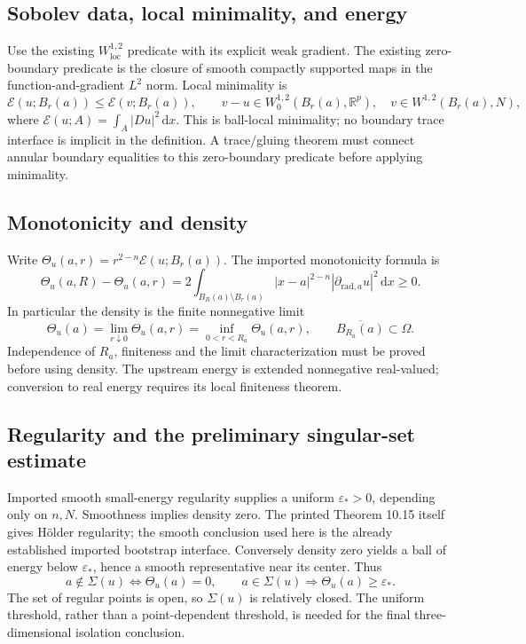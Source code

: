 \documentclass[11pt,a4paper]{article}
\numberwithin{equation}{section}
\theoremstyle{definition}
\theoremstyle{remark}
\newcommand{\R}{\mathbb R}
\newcommand{\dd}{\,\mathrm d}
\newcommand{\E}{\mathcal E}
\newcommand{\Th}{\Theta}
\newcommand{\loc}{\mathrm{loc}}
\begin{document}
\subsection{Sobolev data, local minimality, and energy}\label{def:foundation}
Use the existing $W^{1,2}_{\loc}$ predicate with its explicit weak gradient.
The existing zero-boundary predicate is the closure of smooth compactly
supported maps in the function-and-gradient $L^2$ norm. Local minimality is
\begin{equation}\label{eq:minimality}
 \E(u;B_r(a))\le\E(v;B_r(a)),\qquad
 v-u\in W^{1,2}_0(B_r(a),\R^p),\quad v\in W^{1,2}(B_r(a),N),
\end{equation}
where $\E(u;A)=\int_A|Du|^2\dd x$. This is ball-local minimality;
no boundary trace interface is implicit in the definition. A trace/gluing
theorem must connect annular boundary equalities to this zero-boundary
predicate before applying minimality.

\subsection{Monotonicity and density}\label{def:density}
Write $\Th_u(a,r)=r^{2-n}\E(u;B_r(a))$. The imported monotonicity formula is
\begin{equation}\label{eq:monotonicity}
 \Th_u(a,R)-\Th_u(a,r)
 =2\int_{B_R(a)\setminus B_r(a)}
 |x-a|^{2-n}|\partial_{\mathrm{rad},a}u|^2\dd x\ge0.
\end{equation}
In particular the density is the finite nonnegative limit
\begin{equation}\label{eq:density}
 \Th_u(a)=\lim_{r\downarrow0}\Th_u(a,r)
          =\inf_{0<r<R_a}\Th_u(a,r),
 \qquad \overline{B_{R_a}(a)}\subset\Omega.
\end{equation}
Independence of $R_a$, finiteness and the limit characterization must be
proved before using density. The upstream energy is extended nonnegative
real-valued; conversion to real energy requires its local finiteness theorem.

\subsection{Regularity and the preliminary singular-set estimate}
\label{lem:regular-density}
Imported smooth small-energy regularity supplies a uniform
$\varepsilon_*>0$, depending only on $n,N$. Smoothness implies density zero.
The printed Theorem 10.15 itself gives H\"older regularity; the smooth
conclusion used here is the already established imported bootstrap interface.
Conversely density zero yields a ball of energy below $\varepsilon_*$, hence
a smooth representative near its center. Thus
\begin{equation}\label{eq:density-gap}
 a\notin\Sigma(u)\iff\Th_u(a)=0,\qquad
 a\in\Sigma(u)\Longrightarrow\Th_u(a)\ge\varepsilon_*.
\end{equation}
The set of regular points is open, so $\Sigma(u)$ is relatively closed.
The uniform threshold, rather than a point-dependent threshold, is needed
for the final three-dimensional isolation conclusion.
\end{document}
